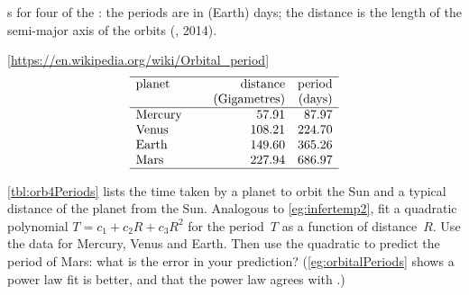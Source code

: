 \begin{exercise} \label{ex:orb4Periods} 
\begin{table}
\caption{s for four  of the : the periods are in (Earth) days; the distance is the length of the semi-major axis of the orbits (, 2014).}
\label{tbl:orb4Periods}
{\footnotesize[\protect\url{https://en.wikipedia.org/wiki/Orbital\_period}]}
\begin{equation*}
\begin{array}{p{12ex}rr} \hline
planet&\text{distance}&\text{period}\\
&\text{(Gigametres)}&\text{(days)}\\\hline
Mercury& 57.91 & 87.97 \\
Venus& 108.21 & 224.70 \\
Earth& 149.60& 365.26\\
Mars& 227.94& 686.97\\\hline
\end{array}
\end{equation*}
\end{table}%
\cref{tbl:orb4Periods} lists the time taken by a planet to orbit the Sun and a typical distance of the planet from the Sun. 
Analogous to \cref{eg:infertemp2}, fit a quadratic polynomial \(T=c_1+c_2R+c_3R^2\) for the period~\(T\) as a function of distance~\(R\).
Use the data for Mercury, Venus and Earth.
Then use the quadratic to predict the period of Mars: what is the error in your prediction?
(\cref{eg:orbitalPeriods} shows a power law fit is better, and that the power law agrees with .)
\end{exercise}







